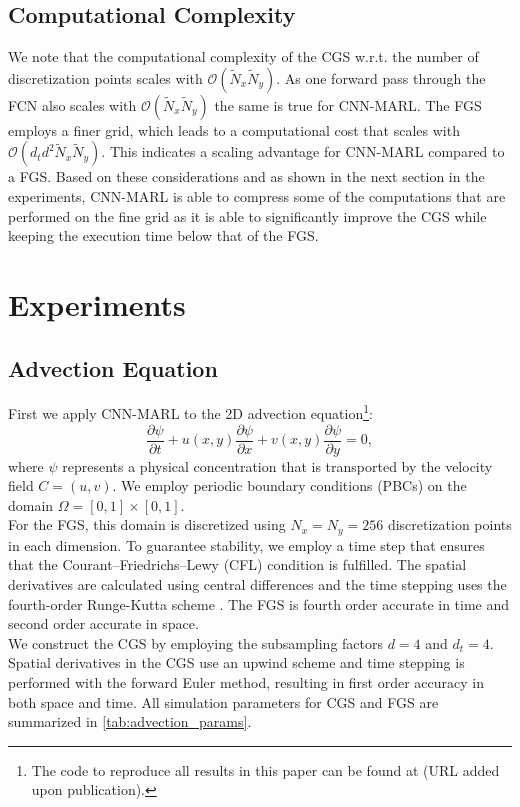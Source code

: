 \documentclass{article}
\theoremstyle{plain}
\theoremstyle{definition}
\theoremstyle{remark}
\begin{document}
\subsection{Computational Complexity}
We note that the computational complexity of the CGS w.r.t. the number of discretization points scales with $\mathcal O(\tilde N_x \tilde N_y)$. As one forward pass through the FCN also scales with $\mathcal O(\tilde N_x \tilde N_y)$ the same is true for CNN-MARL. The FGS employs a finer grid, which leads to a computational cost that scales with $\mathcal O(d_t d ^2 \tilde N_x \tilde N_y)$. This indicates a scaling advantage for CNN-MARL compared to a FGS. Based on these considerations and as shown in the next section in the experiments, CNN-MARL is able to compress some of the computations that are performed on the fine grid as it is able to significantly improve the CGS while keeping the execution time below that of the FGS.

\section{Experiments}
\label{sec:exp}
\subsection{Advection Equation}
First we apply CNN-MARL to the 2D advection equation\footnote{The code to reproduce all results in this paper can be found at (URL added upon publication).}:
\begin{equation}
\frac{\partial \psi}{\partial t} + u(x,y)\frac{\partial \psi}{\partial x} + v(x,y)\frac{\partial \psi}{\partial y} = 0,
\end{equation}
where $\psi$ represents a physical concentration that is transported by the velocity field $C=(u, v)$. We employ periodic boundary conditions (PBCs) on the domain \(\Omega = [0, 1] \times [0, 1]\).\\
For the FGS, this domain is discretized using $N_x=N_y=256$ discretization points in each dimension. To guarantee stability, we employ a time step that ensures that the Courant–Friedrichs–Lewy (CFL) \cite{Courant_1928} condition is fulfilled. The spatial derivatives are calculated using central differences and the time stepping uses the fourth-order Runge-Kutta scheme \cite{quarteroni2008numerical}. The FGS is fourth order accurate in time and second order accurate in space.\\
We construct the CGS by employing the subsampling factors $d=4$ and $d_t=4$.  Spatial derivatives in the CGS use an  upwind scheme and time stepping is performed with the forward Euler method, resulting in first order accuracy in both space and time. All simulation parameters for CGS and FGS are summarized in \cref{tab:advection_params}.
\end{document}
